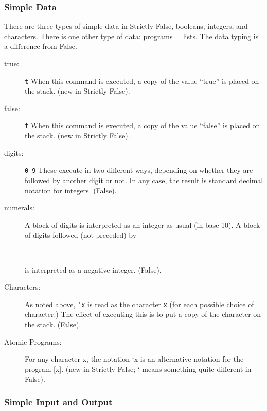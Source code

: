 \documentclass[12pt]{article}
\begin{document}
\subsubsection{Simple Data}

There are three types of simple data in Strictly False, booleans, integers,
and characters.  There is one other type of data:  programs = lists.  The data typing is a difference from False.

\begin{description}

\item[true:]  {\tt t}  When this command is executed, a copy of the value ``true'' is placed on the stack. (new in Strictly False).

\item[false:] {\tt f}  When this command is executed, a copy of the value ``false'' is placed on the stack. (new in Strictly False).

\item[digits:]  {\tt 0-9}  These execute in two different ways, depending
on whether they are followed by another digit or not. In any case,
the result is standard decimal notation for integers. (False).

\item[numerals:] A block of digits is interpreted as an integer as
usual (in base 10).  A block of digits followed (not preceded) by
\begin{verb} _  \end{verb} is interpreted as a negative integer. (False).

\item[Characters:]  As noted above, {\tt 'x} is read as the character {\tt x}
(for each possible choice of character.) The effect of executing this is
to put a copy of the character on the stack. (False).

\item[Atomic Programs:]  For any character x, the notation `x is an alternative
notation for the program [x].  (new in Strictly False; ` means something quite different in False).

\end{description}
\subsubsection{Simple Input and Output}
\end{document}
